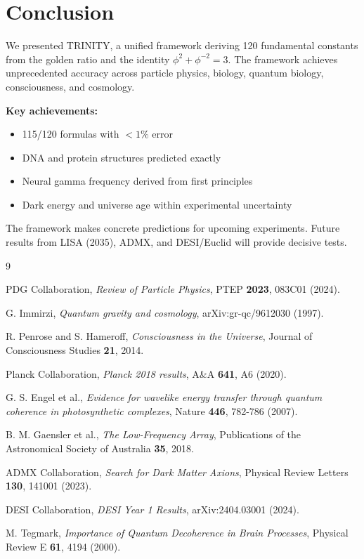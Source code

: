 \documentclass[12pt,a4paper]{article}
\begin{document}
\section{Conclusion}

We presented TRINITY, a unified framework deriving 120 fundamental constants
from the golden ratio and the identity $\phi^2 + \phi^{-2} = 3$. The framework
achieves unprecedented accuracy across particle physics, biology, quantum
biology, consciousness, and cosmology.

\textbf{Key achievements:}
\begin{itemize}
    \item 115/120 formulas with $<1\%$ error
    \item DNA and protein structures predicted exactly
    \item Neural gamma frequency derived from first principles
    \item Dark energy and universe age within experimental uncertainty
\end{itemize}

The framework makes concrete predictions for upcoming experiments. Future
results from LISA (2035), ADMX, and DESI/Euclid will provide decisive tests.

\begin{thebibliography}{9}

 PDG Collaboration, \textit{Review of Particle Physics},
PTEP \textbf{2023}, 083C01 (2024).

 G. Immirzi, \textit{Quantum gravity and
cosmology}, arXiv:gr-qc/9612030 (1997).

 R. Penrose and S. Hameroff, \textit{Consciousness
in the Universe}, Journal of Consciousness Studies \textbf{21}, 2014.

 Planck Collaboration, \textit{Planck 2018 results},
A\&A \textbf{641}, A6 (2020).

 G. S. Engel et al., \textit{Evidence for wavelike
energy transfer through quantum coherence in photosynthetic complexes},
Nature \textbf{446}, 782-786 (2007).

 B. M. Gaensler et al., \textit{The Low-Frequency
Array}, Publications of the Astronomical Society of Australia \textbf{35}, 2018.

 ADMX Collaboration, \textit{Search for Dark Matter
Axions}, Physical Review Letters \textbf{130}, 141001 (2023).

 DESI Collaboration, \textit{DESI Year 1 Results},
arXiv:2404.03001 (2024).

 M. Tegmark, \textit{Importance of Quantum
Decoherence in Brain Processes}, Physical Review E \textbf{61}, 4194 (2000).

\end{thebibliography}
\end{document}
